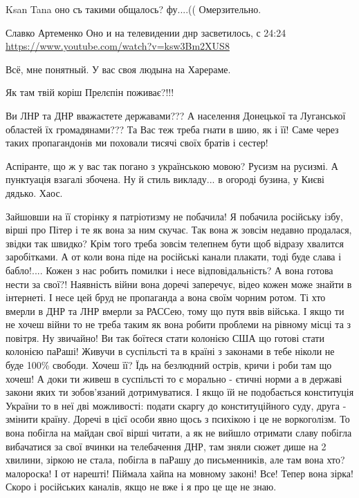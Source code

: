 \begin{itemize}
Ksan Tana оно съ такими общалось? фу....(( Омерзительно.

Славко Артеменко Оно и на телевидении днр засветилось, 
с 24:24 \url{https://www.youtube.com/watch?v=ksw3Bm2XUS8}

Всё, мне понятный. У вас своя людына на Харераме.


Як там твій коріш Прелєпін поживає?!!!


Ви ЛНР та ДНР вважаєтете державами??? А населення Донецької та Луганської
областей їх громадянами???  Та Вас теж треба гнати в шию, як і її! Саме через
таких пропагандонів ми поховали тисячі своїх братів і сестер!


Аспіранте, що ж у вас так погано з українською мовою? Русизм на русизмі. А
пунктуація взагалі збочена. Ну й стиль викладу... в огороді бузина, у Києві
дядько. Хаос.


\obeycr
Зайшовши на її сторінку я патріотизму не побачила!
Я побачила російську ізбу, вірші про Пітер і те як вона за ним скучає.
Так вона ж зовсім недавно продалася, звідки так швидко? Крім того треба зовсім телепнем бути щоб відразу хвалится заробітками. А от коли вона піде на російські канали плакати, тоді буде слава і бабло!....
Кожен з нас робить помилки і несе відповідальність? А вона готова нести за свої?!
Наявність війни вона доречі заперечує, відео кожен може знайти в інтернеті.
І несе цей бруд не пропаганда а вона своїм чорним ротом.
Ті хто вмерли в ДНР та ЛНР вмерли за РАССею, тому що путя ввів війська.
І якщо ти не хочеш війни то не треба таким як вона робити проблеми на рівному місці та з повітря.
Ну звичайно! Ви так боїтеся стати колонією США що готові стати колонією паРаші!
Живучи в суспільсті та в країні з законами в тебе ніколи не буде 100\% свободи. Хочеш її? Їдь на безлюдний острів, кричи і роби там що хочеш!
А доки ти живеш в суспільсті то є морально - єтичні норми а в державі закони яких ти зобов’язаний дотримуватися. І якщо їй не подобається конституція України то в неї дві можливості: подати скаргу до конституційного суду, друга - змінити країну.
Доречі в цієї особи явно щось з психікою і це не воркоголізм. То вона побігла на майдан свої вірші читати, а як не вийшло отримати славу побігла вибачатися за свої вчинки на телебачення ДНР, там зняли сюжет дише на 2 хвилини, зіркою не стала, побігла в паРашу до письменників, але там вона хто? малороска! І от нарешті! Піймала хайпа на мовному законі! Все! Тепер вона зірка! Скоро і російських каналів, якщо не вже і я про це ще не знаю.
\restorecr


\end{itemize}
